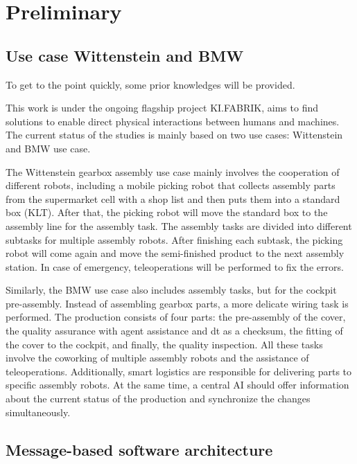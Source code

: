 \chapter{Preliminary} \label{chap: Preliminary}

\section{Use case Wittenstein and BMW}
To get to the point quickly, some prior knowledges will be provided. 

This work is under the ongoing flagship project KI.FABRIK, aims to 
find solutions to enable direct physical interactions between humans and 
machines. The current status of the studies is mainly based on two use 
cases: Wittenstein and BMW use case. 

The Wittenstein gearbox assembly use case mainly involves the cooperation of different 
robots, including a mobile picking robot that collects assembly parts from 
the supermarket cell with a shop list and then puts them into a standard box (KLT). 
After that, the picking robot will move the standard box to the assembly line for 
the assembly task. The assembly tasks are divided into different subtasks for 
multiple assembly robots. After finishing each subtask, the picking robot 
will come again and move the semi-finished product to the next assembly station. 
In case of emergency, teleoperations will be performed to fix the 
errors. 

Similarly, the BMW use case also includes assembly tasks, but for the cockpit 
pre-assembly. Instead of assembling gearbox parts, a more delicate wiring task 
is performed. The production consists of four parts: the pre-assembly of the cover, 
the quality assurance with agent 
assistance and \gls{dt} as a checksum, the fitting of the cover to the cockpit, and 
finally, the quality inspection. All these tasks involve the coworking of 
multiple assembly robots and the assistance of teleoperations. Additionally, 
smart logistics are responsible for delivering parts to 
specific assembly robots. At the same time, a central AI should offer information about the current status of 
the production and synchronize the changes simultaneously. 


\section{Message-based software architecture}

